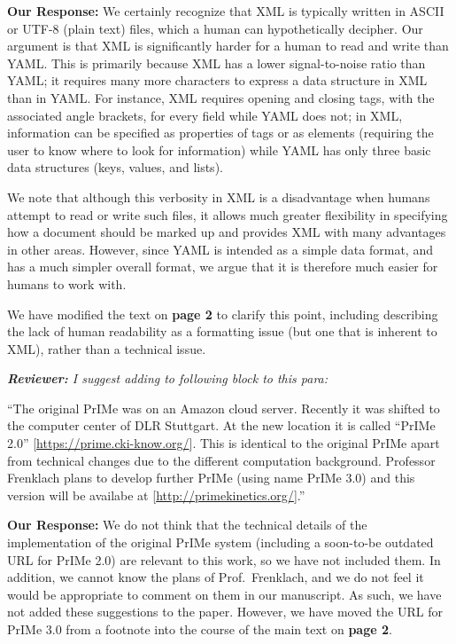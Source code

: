\documentclass[a4paper,10pt]{elsarticle}
\newenvironment{reviewer}{\vspace{0.5\baselineskip}\begingroup\itshape\textbf{Reviewer:}}{\endgroup}
\newenvironment{response}{\textbf{Our Response:}}{\vspace{0.5\baselineskip}}
\begin{document}
\begin{response}
    We certainly recognize that XML is typically written in ASCII or UTF-8 (plain text) files, which
    a human can hypothetically decipher. Our argument is that XML is significantly harder for a
    human to read and write than YAML. This is primarily because XML has a lower signal-to-noise
    ratio than YAML; it requires many more characters to express a data structure in XML than in
    YAML. For instance, XML requires opening and closing tags, with the associated angle brackets,
    for every field while YAML does not; in XML, information can be specified as properties of tags
    or as elements (requiring the user to know where to look for information) while YAML has only
    three basic data structures (keys, values, and lists).

    We note that although this verbosity in XML is a disadvantage when humans attempt to read or
    write such files, it allows much greater flexibility in specifying how a document should be
    marked up and provides XML with many advantages in other areas. However, since YAML is intended
    as a simple data format, and has a much simpler overall format, we argue that it is therefore
    much easier for humans to work with.

    We have modified the text on \textbf{page 2} to clarify this point, including describing the lack of human
    readability as a formatting issue (but one that is inherent to XML), rather than a technical
    issue.
\end{response}

\begin{reviewer}
    I suggest adding to following block to this para:

    ``The original PrIMe was on an Amazon cloud server. Recently it was shifted to the computer
    center of DLR Stuttgart. At the new location it is called ``PrIMe 2.0''
    [\url{https://prime.cki-know.org/}]. This is identical to the original PrIMe apart from
    technical changes due to the different computation background. Professor Frenklach plans to
    develop further PrIMe (using name PrIMe 3.0) and this version will be availabe at
    [\url{http://primekinetics.org/}].''
\end{reviewer}

\begin{response}
    We do not think that the technical details of the implementation of the original PrIMe system
    (including a soon-to-be outdated URL for PrIMe 2.0) are relevant to this work, so we have not
    included them. In addition, we cannot know the plans of Prof.~Frenklach, and we do not feel it
    would be appropriate to comment on them in our manuscript. As such, we have not added these
    suggestions to the paper. However, we have moved the URL for PrIMe 3.0 from a footnote into the
    course of the main text on \textbf{page 2}.
\end{response}
\end{document}

